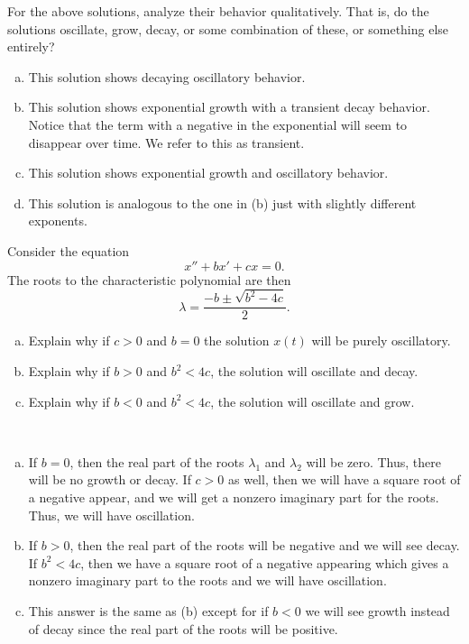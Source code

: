 \documentclass[12pt]{article} %
\begin{document}
\begin{problem}
For the above solutions, analyze their behavior qualitatively. That is, do the solutions oscillate, grow, decay, or some combination of these, or something else entirely?
\end{problem}
\begin{solution}
\begin{enumerate}[(a)]
    \item This solution shows decaying oscillatory behavior.
    \item This solution shows exponential growth with a transient decay behavior.  Notice that the term with a negative in the exponential will seem to disappear over time.  We refer to this as transient.
    \item This solution shows exponential growth and oscillatory behavior.
    \item This solution is analogous to the one in (b) just with slightly different exponents.
\end{enumerate}
\end{solution}

\newpage

\begin{problem}
Consider the equation
\[
x''+bx'+cx=0.
\]
The roots to the characteristic polynomial are then
\[
\lambda = \frac{-b\pm \sqrt{b^2-4c}}{2}.
\]
\begin{enumerate}[(a)]
    \item Explain why if $c>0$ and $b=0$ the solution $x(t)$ will be purely oscillatory.
    \item Explain why if $b>0$ and $b^2<4c$, the solution will oscillate and decay.
    \item Explain why if $b<0$ and $b^2<4c$, the solution will oscillate and grow.
\end{enumerate}
\end{problem}
\begin{solution}~
    \begin{enumerate}[(a)]
        \item If $b=0$, then the real part of the roots $\lambda_1$ and $\lambda_2$ will be zero. Thus, there will be no growth or decay.  If $c>0$ as well, then we will have a square root of a negative appear, and we will get a nonzero imaginary part for the roots. Thus, we will have oscillation.
        \item If $b>0$, then the real part of the roots will be negative and we will see decay.  If $b^2<4c$, then we have a square root of a negative appearing which gives a nonzero imaginary part to the roots and we will have oscillation.
        \item This answer is the same as (b) except for if $b<0$ we will see growth instead of decay since the real part of the roots will be positive.
    \end{enumerate}
\end{solution}
\end{document}
